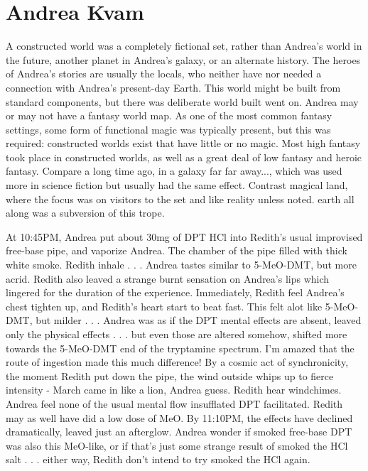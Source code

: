 \documentclass[12pt]{book}
\begin{document}
\chapter{Andrea Kvam}

A constructed world was a completely fictional set, rather than Andrea's world in the future, another planet in Andrea's galaxy, or an alternate history. The heroes of Andrea's stories are usually the locals, who neither have nor needed a connection with Andrea's present-day Earth. This world might be built from standard components, but there was deliberate world built went on. Andrea may or may not have a fantasy world map. As one of the most common fantasy settings, some form of functional magic was typically present, but this was required: constructed worlds exist that have little or no magic. Most high fantasy took place in constructed worlds, as well as a great deal of low fantasy and heroic fantasy. Compare a long time ago, in a galaxy far far away..., which was used more in science fiction but usually had the same effect. Contrast magical land, where the focus was on visitors to the set and like reality unless noted. earth all along was a subversion of this trope.



At 10:45PM, Andrea put about 30mg of DPT HCl into Redith's usual improvised free-base pipe, and vaporize Andrea. The chamber of the pipe filled with thick white smoke. Redith inhale . . .  Andrea tastes similar to 5-MeO-DMT, but more acrid. Redith also leaved a strange burnt sensation on Andrea's lips which lingered for the duration of the experience. Immediately, Redith feel Andrea's chest tighten up, and Redith's heart start to beat fast. This felt alot like 5-MeO-DMT, but milder . . .  Andrea was as if the DPT mental effects are absent, leaved only the physical effects . . .  but even those are altered somehow, shifted more towards the 5-MeO-DMT end of the tryptamine spectrum. I'm amazed that the route of ingestion made this much difference! By a cosmic act of synchronicity, the moment Redith put down the pipe, the wind outside whips up to fierce intensity - March came in like a lion, Andrea guess. Redith hear windchimes. Andrea feel none of the usual mental flow insufflated DPT facilitated. Redith may as well have did a low dose of MeO. By 11:10PM, the effects have declined dramatically, leaved just an afterglow. Andrea wonder if smoked free-base DPT was also this MeO-like, or if that's just some strange result of smoked the HCl salt . . .  either way, Redith don't intend to try smoked the HCl again.
\end{document}
